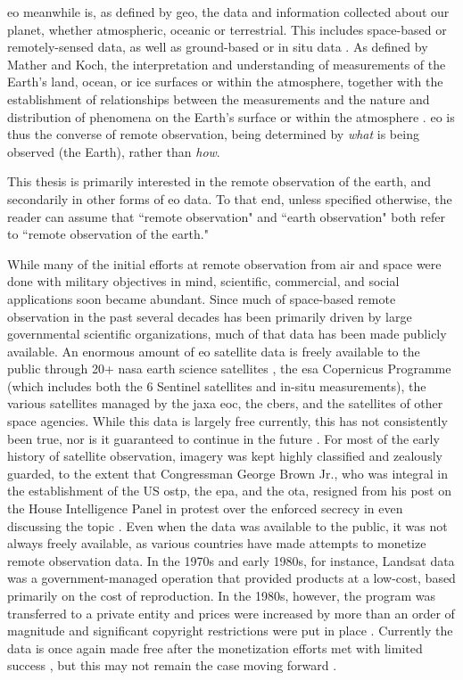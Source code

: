 \Acf{eo} meanwhile is, as defined by \ac{geo}, the data and information collected about our planet, whether atmospheric, oceanic or terrestrial. This includes space-based or remotely-sensed data, as well as ground-based or in situ data \cite{grouponearthobservationsGEOGlance2019}. As defined by Mather and Koch, the interpretation and understanding of measurements of the Earth's land, ocean, or ice surfaces or within the atmosphere, together with the establishment of relationships between the measurements and the nature and distribution of phenomena on the Earth's surface or within the atmosphere \cite{matherComputerProcessingRemotelySensed2011}. \ac{eo} is thus the converse of remote observation, being determined by \textit{what} is being observed (the Earth), rather than \textit{how}. 

This thesis is primarily interested in the remote observation of the earth, and secondarily in other forms of \ac{eo} data. To that end, unless specified otherwise, the reader can assume that ``remote observation" and ``earth observation" both refer to ``remote observation of the earth."

While many of the initial efforts at remote observation from air and space were done with military objectives in mind, scientific, commercial, and social applications soon became abundant. Since much of space-based remote observation in the past several decades has been primarily driven by large governmental scientific organizations, much of that data has been made publicly available. An enormous amount of \ac{eo} satellite data is freely available to the public through 20+ \ac{nasa} earth science satellites \cite{shirahNASAEarthObserving2017}, the \ac{esa} Copernicus Programme (which includes both the 6 Sentinel satellites and in-situ measurements), the various satellites managed by the \ac{jaxa} \ac{eoc}, the \ac{cbers}, and the satellites of other space agencies. While this data is largely free currently, this has not consistently been true, nor is it guaranteed to continue in the future \cite{borowitzOpenSpaceGlobal2017}. For most of the early history of satellite observation, imagery was kept highly classified and zealously guarded, to the extent that Congressman George Brown Jr., who was integral in the establishment of the US \ac{ostp}, the \ac{epa}, and the \ac{ota}, resigned from his post on the House Intelligence Panel in protest over the enforced secrecy in even discussing the topic \cite{healyRepBrownQuits1987, barry1992mappings}. Even when the data was available to the public, it was not always freely available, as various countries have made attempts to monetize remote observation data. In the 1970s and early 1980s, for instance, Landsat data was a government-managed operation that provided products at a low-cost, based primarily on the cost of reproduction. In the 1980s, however, the program was transferred to a private entity and prices were increased by more than an order of magnitude and significant copyright restrictions were put in place \cite{mchaffieManufacturingMetaphors1994}. Currently the data is once again made free after the monetization efforts met with limited success \cite{waldropLandsatCommercializationStumbles1987}, but this may not remain the case moving forward \cite{popkinUSGovernmentConsiders2018}.

